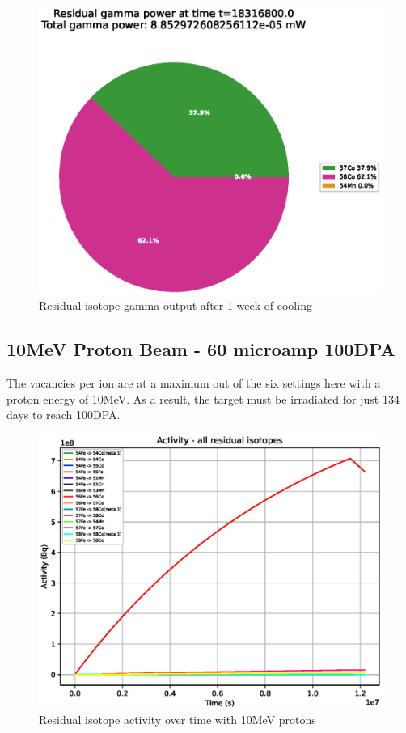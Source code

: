 \begin{figure}[!htb]
\centering
\includegraphics[width=0.7\linewidth]{chapters/activity_code/fe_100dpa/endofbeam/05MeV_0500_18316800.eps}
\caption{Residual isotope gamma output after 1 week of cooling}
\label{fig:5mev-proton-100dpa}
\end{figure}


\clearpage
\FloatBarrier
\subsection{10MeV Proton Beam - 60 microamp 100DPA}

The vacancies per ion are at a maximum out of the six settings here with a proton energy of 10MeV.  As a result, the target must be irradiated for just 134 days to reach 100DPA.

\begin{figure}[!htb]
\centering
\includegraphics[width=0.7\linewidth]{chapters/activity_code/fe_100dpa/by_isotope/10MeV_all_radioactive_isotopes.eps}
\caption{Residual isotope activity over time with 10MeV protons}
\label{fig:10mev-proton-100dpa-activity}
\end{figure}

